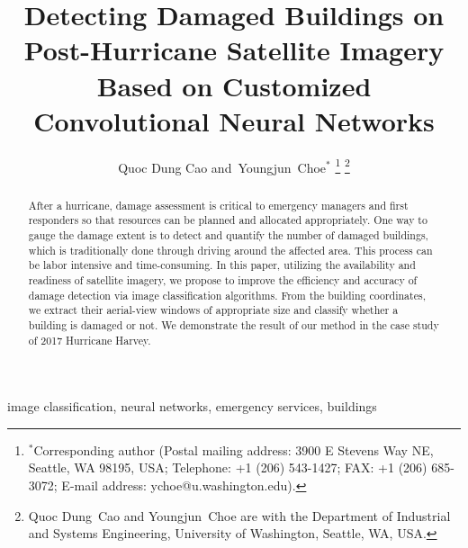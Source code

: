 \documentclass[journal, 12pt, onecolumn,draftclsnofoot]{IEEEtran}
\begin{document}
\title{Detecting Damaged Buildings on Post-Hurricane Satellite Imagery Based on Customized Convolutional Neural Networks}

\author{Quoc Dung Cao
        and~Youngjun~Choe$^{*}$%
\thanks{$^{*}$Corresponding author (Postal mailing address: 3900 E Stevens Way NE,
Seattle, WA 98195, USA; Telephone: +1 (206) 543-1427; FAX: +1 (206) 685-3072; E-mail address: ychoe@u.washington.edu).}
\thanks{Quoc Dung~Cao and Youngjun~Choe are with the Department of Industrial and Systems Engineering, University of Washington, Seattle, WA, USA.}}%
















\maketitle

\begin{abstract}
After a hurricane, damage assessment is critical to emergency managers and first responders so that resources can be planned and allocated appropriately. One way to gauge the damage extent is to detect and quantify the number of damaged buildings, which is traditionally done through driving around the affected area. This process can be labor intensive and time-consuming. In this paper, utilizing the availability and readiness of satellite imagery, we propose to improve the efficiency and accuracy of damage detection via image classification algorithms. From the building coordinates, we extract their aerial-view windows of appropriate size and classify whether a building is damaged or not. We demonstrate the result of our method in the case study of 2017 Hurricane Harvey.
\end{abstract}

\begin{IEEEkeywords}
image classification, neural networks, emergency services, buildings %
\end{IEEEkeywords}






\IEEEpeerreviewmaketitle
\end{document}
